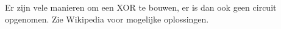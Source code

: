 Er zijn vele manieren om een XOR te bouwen, er is dan ook geen circuit opgenomen. Zie Wikipedia voor mogelijke oplossingen.

